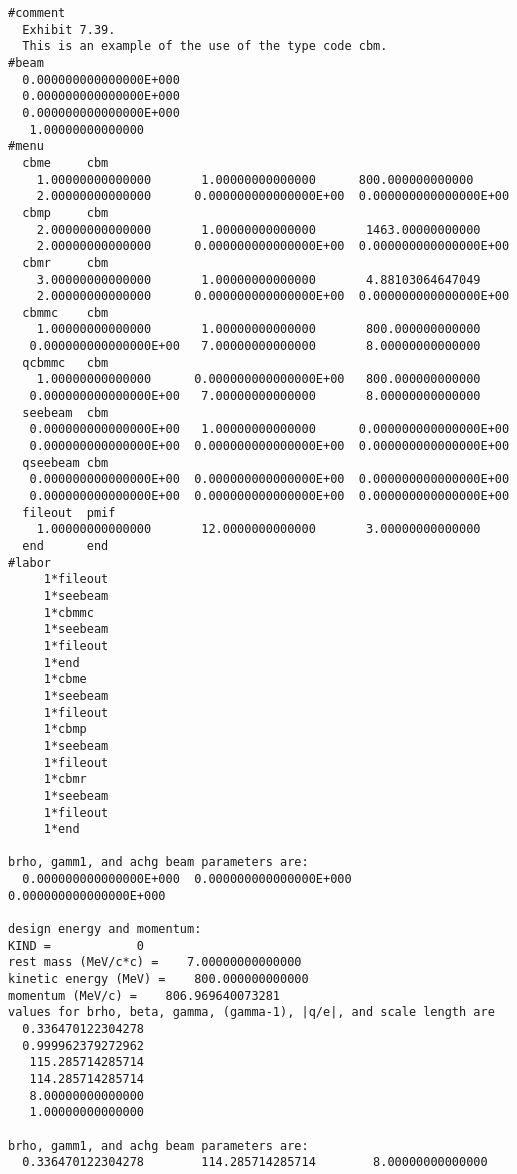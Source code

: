 \vspace{5mm}
\begin{footnotesize}
\begin{verbatim}
#comment
  Exhibit 7.39.
  This is an example of the use of the type code cbm.
#beam
  0.000000000000000E+000
  0.000000000000000E+000
  0.000000000000000E+000
   1.00000000000000
#menu
  cbme     cbm
    1.00000000000000       1.00000000000000      800.000000000000
    2.00000000000000      0.000000000000000E+00  0.000000000000000E+00
  cbmp     cbm
    2.00000000000000       1.00000000000000       1463.00000000000
    2.00000000000000      0.000000000000000E+00  0.000000000000000E+00
  cbmr     cbm
    3.00000000000000       1.00000000000000       4.88103064647049
    2.00000000000000      0.000000000000000E+00  0.000000000000000E+00
  cbmmc    cbm
    1.00000000000000       1.00000000000000       800.000000000000
   0.000000000000000E+00   7.00000000000000       8.00000000000000
  qcbmmc   cbm
    1.00000000000000      0.000000000000000E+00   800.000000000000
   0.000000000000000E+00   7.00000000000000       8.00000000000000
  seebeam  cbm
   0.000000000000000E+00   1.00000000000000      0.000000000000000E+00
   0.000000000000000E+00  0.000000000000000E+00  0.000000000000000E+00
  qseebeam cbm
   0.000000000000000E+00  0.000000000000000E+00  0.000000000000000E+00
   0.000000000000000E+00  0.000000000000000E+00  0.000000000000000E+00
  fileout  pmif
    1.00000000000000       12.0000000000000       3.00000000000000
  end      end
#labor
     1*fileout
     1*seebeam
     1*cbmmc
     1*seebeam
     1*fileout
     1*end
     1*cbme
     1*seebeam
     1*fileout
     1*cbmp
     1*seebeam
     1*fileout
     1*cbmr
     1*seebeam
     1*fileout
     1*end

brho, gamm1, and achg beam parameters are:
  0.000000000000000E+000  0.000000000000000E+000  0.000000000000000E+000

design energy and momentum:
KIND =            0
rest mass (MeV/c*c) =    7.00000000000000
kinetic energy (MeV) =    800.000000000000
momentum (MeV/c) =    806.969640073281
values for brho, beta, gamma, (gamma-1), |q/e|, and scale length are
  0.336470122304278
  0.999962379272962
   115.285714285714
   114.285714285714
   8.00000000000000
   1.00000000000000

brho, gamm1, and achg beam parameters are:
  0.336470122304278        114.285714285714        8.00000000000000


\end{verbatim}
\end{footnotesize}
